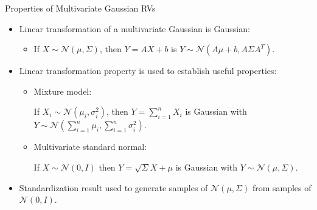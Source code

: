 \documentclass[handout,9pt]{beamer}
\begin{document}
%
\begin{frame}{Properties of Multivariate Gaussian RVs}

\begin{itemize}
\setlength{\itemsep}{5pt}
\item Linear transformation of a multivariate Gaussian is Gaussian: 
\begin{itemize}
\setlength{\itemsep}{5pt}
\item If $X\sim\mathcal{N}(\mu,\Sigma)$, then $Y=AX+b$ is $Y\sim \mathcal{N}(A\mu+b,A\Sigma A^T)$. 
\end{itemize}
\vspace{0.1in}
\item Linear transformation property is used to establish useful properties:
\begin{itemize}
\setlength{\itemsep}{5pt}
\item Mixture model:

 If $X_i\sim \mathcal{N}(\mu_i,\sigma_i^2)$, then $Y=\sum_{i=1}^nX_i$ is Gaussian with $Y\sim\mathcal{N}(\sum_{i=1}^n\mu_i,\sum_{i=1}^n\sigma_i^2)$. 
 \vspace{0.1in}
\item Multivariate standard normal: 

If $X\sim\mathcal{N}(0,{I})$ then $Y=\sqrt{\Sigma}X+\mu$ is Gaussian with $Y\sim\mathcal{N}(\mu,\Sigma)$.
\end{itemize}
\item Standardization result used to generate samples of $\mathcal{N}(\mu,\Sigma)$ from samples of $\mathcal{N}(0,I)$.
\end{itemize}

\end{frame}
\end{document}
